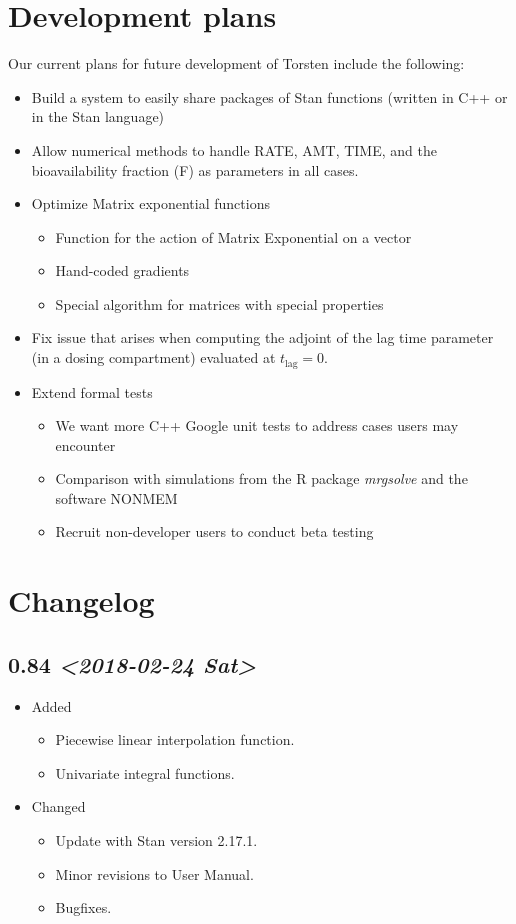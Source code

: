 \documentclass[11pt, reqno]{amsbook}
\numberwithin{section}{chapter}
\theoremstyle{remark}
\begin{document}
\section{Development plans}
\label{sec:orgced1241}
Our current plans for future development of Torsten include the
following:
\begin{itemize}
\item Build a system to easily share packages of Stan functions
(written in C++ or in the Stan language)
\item Allow numerical methods to handle RATE, AMT, TIME, and the
bioavailability fraction (F) as parameters in all cases.
\item Optimize Matrix exponential functions
\begin{itemize}
\item Function for the action of Matrix Exponential on a vector
\item Hand-coded gradients
\item Special algorithm for matrices with special properties
\end{itemize}
\item Fix issue that arises when computing the adjoint of the lag time
parameter (in a dosing compartment) evaluated at \(t_{\text{lag}} = 0\).
\item Extend formal tests
\begin{itemize}
\item We want more C++ Google unit tests to address cases users may
encounter
\item Comparison with simulations from the R package
\emph{mrgsolve} and the software NONMEM\textregistered{}
\item Recruit non-developer users to conduct beta testing
\end{itemize}
\end{itemize}

\section{Changelog}
\label{sec:org6cb8734}
\subsection*{0.84 \textit{<2018-02-24 Sat>}}
\label{sec:org528a125}
\begin{itemize}
\item Added
\label{sec:orgd746f42}
\begin{itemize}
\item Piecewise linear interpolation function.
\item Univariate integral functions.
\end{itemize}

\item Changed
\label{sec:orge72f6a9}
\begin{itemize}
\item Update with Stan version 2.17.1.
\item Minor revisions to User Manual.
\item Bugfixes.
\end{itemize}
\end{itemize}
\end{document}
